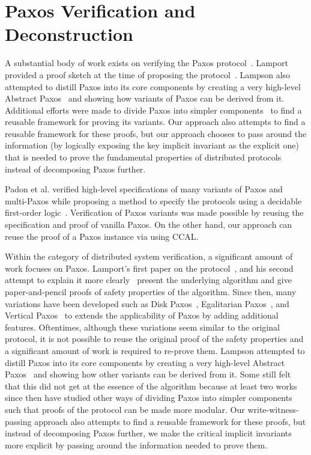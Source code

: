 \section{Paxos Verification and Deconstruction}
\label{chatper:related:sec:paxos-verification-and-decomposition}

A substantial body of work exists on verifying the Paxos protocol~\cite{paxos}.
Lamport provided a proof sketch at the time of proposing the protocol~\cite{paxosmadesimple}.
Lampson also attempted to distill Paxos into its core components by creating a very
high-level Abstract Paxos~\cite{Lampson2001} and showing how variants of
Paxos can be derived from it. 
Additional efforts were made to divide Paxos
into simpler components~\cite{dpaxos, sdpaxos} to find a reusable framework for
proving its variants. Our approach also attempts
to find a reusable framework for these proofs,
but our approach chooses to pass around the information (by logically exposing the key implicit invariant as the explicit one)
 that is needed to prove the fundamental properties of distributed protocols instead of decomposing Paxos further. 

Padon et al. verified high-level specifications of many variants of Paxos
and multi-Paxos while proposing a method to specify the protocols using
a decidable first-order logic~\cite{paxosepr}. Verification of Paxos
variants was made possible by reusing the specification and proof of vanilla
Paxos. 
On the other hand, our approach can reuse the proof of a Paxos instance
via using CCAL. 


Within the category of distributed system verification,
a significant amount of work focuses on Paxos.
Lamport's first paper on the protocol~\cite{paxos}, and his second attempt to explain it more clearly~\cite{paxosmadesimple}
present the underlying algorithm and give paper-and-pencil proofs of safety properties of the algorithm.
Since then, many variations have been developed such as Disk Paxos~\cite{diskpaxos}, Egalitarian Paxos~\cite{epaxos},
and Vertical Paxos~\cite{vertpaxos} to extends the applicability of Paxos by adding additional features. 
Oftentimes, although these variations seem similar to the original protocol, 
it is not possible to reuse the original
proof of the safety properties and a significant amount of work is required to re-prove them.
Lampson attempted to distill Paxos into its core components by creating a very high-level Abstract Paxos~\cite{Lampson2001}
and showing how other variants can be derived from it.
Some still felt that this did not get at the essence of the algorithm because at least two works since then \cite{dpaxos, sdpaxos}
have studied other ways of dividing Paxos into simpler components such that  proofs of the protocol can be made more modular.
Our write-witness-passing approach also attempts to find a reusable framework for these proofs,
but instead of decomposing Paxos further, we make the critical implicit invariants more explicit by passing around
the information needed to prove them.

